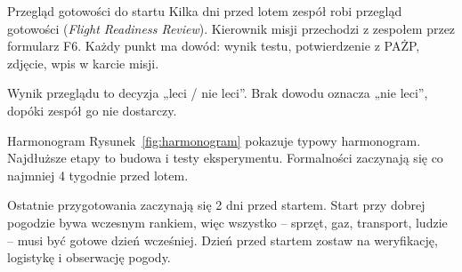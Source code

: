 \clearpage
\begin{sekcja}{Przegląd gotowości do startu}
Kilka dni przed lotem zespół robi przegląd gotowości (\emph{Flight Readiness Review}). Kierownik misji przechodzi z zespołem przez formularz F6. Każdy punkt ma dowód: wynik testu, potwierdzenie z PAŻP, zdjęcie, wpis w karcie misji.

Wynik przeglądu to decyzja „leci / nie leci”. Brak dowodu oznacza „nie leci”, dopóki zespół go nie dostarczy.
\end{sekcja}

\begin{sekcja}{Harmonogram}
Rysunek~\ref{fig:harmonogram} pokazuje typowy harmonogram. Najdłuższe etapy to budowa i testy eksperymentu. Formalności zaczynają się co najmniej 4 tygodnie przed lotem.

Ostatnie przygotowania zaczynają się 2 dni przed startem. Start przy dobrej pogodzie bywa wczesnym rankiem, więc wszystko -- sprzęt, gaz, transport, ludzie -- musi być gotowe dzień wcześniej. Dzień przed startem zostaw na weryfikację, logistykę i obserwację pogody.

\begin{center}\resizebox{0.85\linewidth}{!}{\rysHarmonogram}\end{center}
\label{fig:harmonogram}
\end{sekcja}
